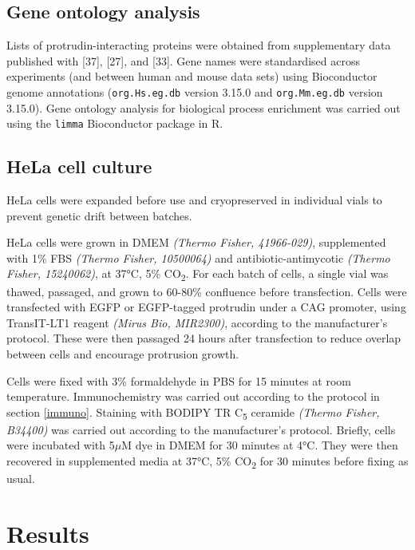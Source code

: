 \documentclass[
  12pt,
  a4paper,
]{book}
\begin{document}
\hypertarget{gene-ontology-analysis}{%
\subsection{Gene ontology analysis}\label{gene-ontology-analysis}}

Lists of protrudin-interacting proteins were obtained from supplementary data published with {[}37{]}, {[}27{]}, and {[}33{]}. Gene names were standardised across experiments (and between human and mouse data sets) using Bioconductor genome annotations (\texttt{org.Hs.eg.db} version 3.15.0 and \texttt{org.Mm.eg.db} version 3.15.0). Gene ontology analysis for biological process enrichment was carried out using the \texttt{limma} Bioconductor package in R.

\hypertarget{hela-cell-culture}{%
\subsection{HeLa cell culture}\label{hela-cell-culture}}

HeLa cells were expanded before use and cryopreserved in individual vials to prevent genetic drift between batches.

HeLa cells were grown in DMEM \emph{(Thermo Fisher, 41966-029)}, supplemented with 1\% FBS \emph{(Thermo Fisher, 10500064)} and antibiotic-antimycotic \emph{(Thermo Fisher, 15240062)}, at 37°C, 5\% CO\textsubscript{2}. For each batch of cells, a single vial was thawed, passaged, and grown to 60-80\% confluence before transfection. Cells were transfected with EGFP or EGFP-tagged protrudin under a CAG promoter, using TransIT-LT1 reagent \emph{(Mirus Bio, MIR2300)}, according to the manufacturer's protocol. These were then passaged 24 hours after transfection to reduce overlap between cells and encourage protrusion growth.

Cells were fixed with 3\% formaldehyde in PBS for 15 minutes at room temperature. Immunochemistry was carried out according to the protocol in section \ref{immuno}. Staining with BODIPY TR C\textsubscript{5} ceramide \emph{(Thermo Fisher, B34400)} was carried out according to the manufacturer's protocol. Briefly, cells were incubated with 5\(\mu\)M dye in DMEM for 30 minutes at 4°C. They were then recovered in supplemented media at 37°C, 5\% CO\textsubscript{2} for 30 minutes before fixing as usual.

\hypertarget{results-1}{%
\section{Results}\label{results-1}}
\end{document}
